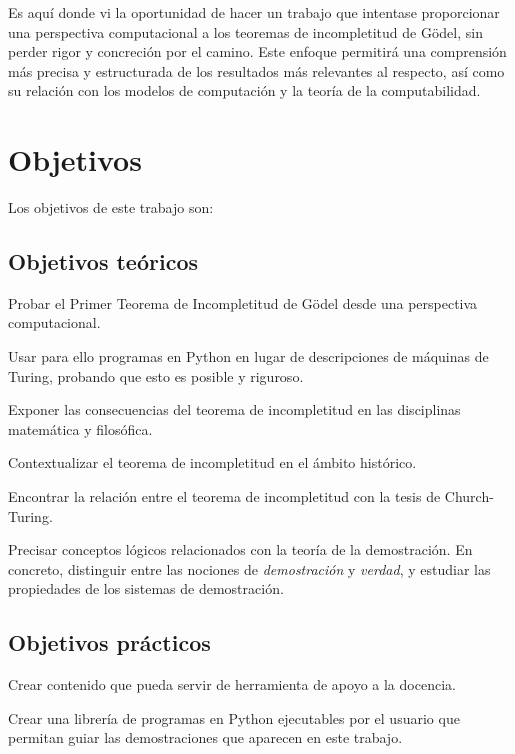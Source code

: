 Es aquí donde vi la oportunidad de hacer un trabajo que intentase proporcionar una perspectiva computacional a los teoremas de incompletitud de Gödel, sin perder rigor y concreción por el camino. Este enfoque permitirá una comprensión más precisa y estructurada de los resultados más relevantes al respecto, así como su relación con los modelos de computación y la teoría de la computabilidad.

\pagebreak

\section*{Objetivos}

Los objetivos de este trabajo son:

\subsection*{Objetivos teóricos}

\begin{enumerate}[label={[}T\arabic*{]},wide = 0pt,widest={10}, leftmargin =*]
    \item Probar el Primer Teorema de Incompletitud de Gödel desde una perspectiva computacional.
    \item Usar para ello programas en Python en lugar de descripciones de máquinas de Turing, probando que esto es posible y riguroso.
    \item Exponer las consecuencias del teorema de incompletitud en las disciplinas matemática y filosófica.
    \item Contextualizar el teorema de incompletitud en el ámbito histórico.
    \item Encontrar la relación entre el teorema de incompletitud con la tesis de Church-Turing.
    \item Precisar conceptos lógicos relacionados con la teoría de la demostración. En concreto, distinguir entre las nociones de \emph{demostración} y \emph{verdad}, y estudiar las propiedades de los sistemas de demostración.
\end{enumerate}

\subsection*{Objetivos prácticos}

\begin{enumerate}[label={[}P\arabic*{]},wide = 0pt,widest={10}, leftmargin =*]
    \item Crear contenido que pueda servir de herramienta de apoyo a la docencia.
    \item Crear una librería de programas en Python ejecutables por el usuario que permitan guiar las demostraciones que aparecen en este trabajo.
\end{enumerate}

\endinput
